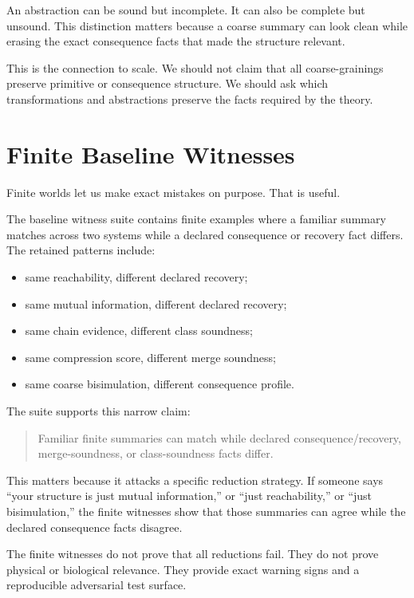 \documentclass[11pt]{article}
\begin{document}
An abstraction can be sound but incomplete. It can also be complete but
unsound. This distinction matters because a coarse summary can look clean while
erasing the exact consequence facts that made the structure relevant.

This is the connection to scale. We should not claim that all coarse-grainings
preserve primitive or consequence structure. We should ask which
transformations and abstractions preserve the facts required by the theory.

\section{Finite Baseline Witnesses}

Finite worlds let us make exact mistakes on purpose. That is useful.

The baseline witness suite contains finite examples where a familiar summary
matches across two systems while a declared consequence or recovery fact
differs. The retained patterns include:

\begin{itemize}[leftmargin=*]
  \item same reachability, different declared recovery;
  \item same mutual information, different declared recovery;
  \item same chain evidence, different class soundness;
  \item same compression score, different merge soundness;
  \item same coarse bisimulation, different consequence profile.
\end{itemize}

The suite supports this narrow claim:

\begin{quote}
Familiar finite summaries can match while declared consequence/recovery,
merge-soundness, or class-soundness facts differ.
\end{quote}

This matters because it attacks a specific reduction strategy. If someone says
``your structure is just mutual information,'' or ``just reachability,'' or
``just bisimulation,'' the finite witnesses show that those summaries can agree
while the declared consequence facts disagree.

The finite witnesses do not prove that all reductions fail. They do not prove
physical or biological relevance. They provide exact warning signs and a
reproducible adversarial test surface.
\end{document}
